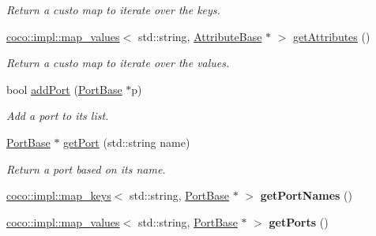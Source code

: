 \begin{DoxyCompactItemize}
\begin{DoxyCompactList}\small\item\em Return a custo map to iterate over the keys. \end{DoxyCompactList}\item 
\hypertarget{classcoco_1_1_service_ac7ef2f278ddf72fab9e8dd1d2c03f277}{}\hyperlink{structcoco_1_1impl_1_1map__values}{coco\+::impl\+::map\+\_\+values}$<$ std\+::string, \hyperlink{classcoco_1_1_attribute_base}{Attribute\+Base} $\ast$ $>$ \hyperlink{classcoco_1_1_service_ac7ef2f278ddf72fab9e8dd1d2c03f277}{get\+Attributes} ()\label{classcoco_1_1_service_ac7ef2f278ddf72fab9e8dd1d2c03f277}

\begin{DoxyCompactList}\small\item\em Return a custo map to iterate over the values. \end{DoxyCompactList}\item 
\hypertarget{classcoco_1_1_service_a57fce01d8c5fc7b77058238a072d4fce}{}bool \hyperlink{classcoco_1_1_service_a57fce01d8c5fc7b77058238a072d4fce}{add\+Port} (\hyperlink{classcoco_1_1_port_base}{Port\+Base} $\ast$p)\label{classcoco_1_1_service_a57fce01d8c5fc7b77058238a072d4fce}

\begin{DoxyCompactList}\small\item\em Add a port to its list. \end{DoxyCompactList}\item 
\hypertarget{classcoco_1_1_service_a12e05c075e9fd899e795a1e929333c71}{}\hyperlink{classcoco_1_1_port_base}{Port\+Base} $\ast$ \hyperlink{classcoco_1_1_service_a12e05c075e9fd899e795a1e929333c71}{get\+Port} (std\+::string name)\label{classcoco_1_1_service_a12e05c075e9fd899e795a1e929333c71}

\begin{DoxyCompactList}\small\item\em Return a port based on its name. \end{DoxyCompactList}\item 
\hypertarget{classcoco_1_1_service_a5c2bcd05477b3058ac40de1d1c60e0c3}{}\hyperlink{structcoco_1_1impl_1_1map__keys}{coco\+::impl\+::map\+\_\+keys}$<$ std\+::string, \hyperlink{classcoco_1_1_port_base}{Port\+Base} $\ast$ $>$ {\bfseries get\+Port\+Names} ()\label{classcoco_1_1_service_a5c2bcd05477b3058ac40de1d1c60e0c3}

\item 
\hypertarget{classcoco_1_1_service_a9a980751ec51e1149302049d111d897f}{}\hyperlink{structcoco_1_1impl_1_1map__values}{coco\+::impl\+::map\+\_\+values}$<$ std\+::string, \hyperlink{classcoco_1_1_port_base}{Port\+Base} $\ast$ $>$ {\bfseries get\+Ports} ()\label{classcoco_1_1_service_a9a980751ec51e1149302049d111d897f}


\end{DoxyCompactItemize}

